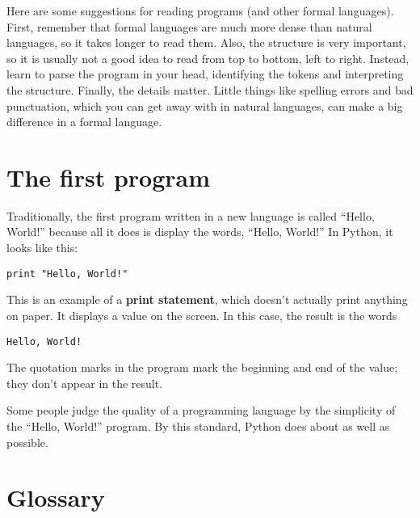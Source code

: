 Here are some suggestions for reading programs (and other formal
languages).  First, remember that formal languages are much more dense
than natural languages, so it takes longer to read them.  Also, the
structure is very important, so it is usually not a good idea to read
from top to bottom, left to right.  Instead, learn to parse the
program in your head, identifying the tokens and interpreting the
structure.  Finally, the details matter.  Little things
like spelling errors and bad punctuation, which you can get away
with in natural languages, can make a big difference in a formal
language.

\section{The first program}
\label{hello}

Traditionally, the first program written in a new language
is called ``Hello, World!'' because all it does is display the
words, ``Hello, World!''  In Python, it looks like this:


\beforeverb
\begin{verbatim}
print "Hello, World!"
\end{verbatim}
\afterverb
%
This is an example of a {\bf print statement}, which doesn't
actually print anything on paper.  It displays a value on the
screen.  In this case, the result is the words


\beforeverb
\begin{verbatim}
Hello, World!
\end{verbatim}
\afterverb
%
The quotation marks in the program mark the beginning and end
of the value; they don't appear in the result.


Some people judge the quality of a programming language by the
simplicity of the ``Hello, World!'' program.  By this standard, Python
does about as well as possible.

\section{Glossary}

